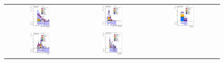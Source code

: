 \clearpage
\begin{figure}[htbp]
\begin{center}
\begin{tabular}{ccc}
%
\includegraphics[width=0.30\textwidth]{appendices/figures/sdrs/JetPtB1_ELEMUONCR9_1W_NOMINAL.eps}  &
\includegraphics[width=0.30\textwidth]{appendices/figures/sdrs/JetPtB2_ELEMUONCR9_1W_NOMINAL.eps} &
\includegraphics[width=0.30\textwidth]{appendices/figures/sdrs/nWhad_ELEMUONCR9_1W_NOMINAL_logscale.eps} \\
\includegraphics[width=0.30\textwidth]{appendices/figures/sdrs/VLQAna_WbX_W1Pt_ELEMUONCR9_1W_NOMINAL.eps} &
\includegraphics[width=0.30\textwidth]{appendices/figures/sdrs/VLQAna_WbX_DRLepMet_ELEMUONCR9_1W_NOMINAL.eps} &

\end{tabular}
\end{center}
\end{figure}
